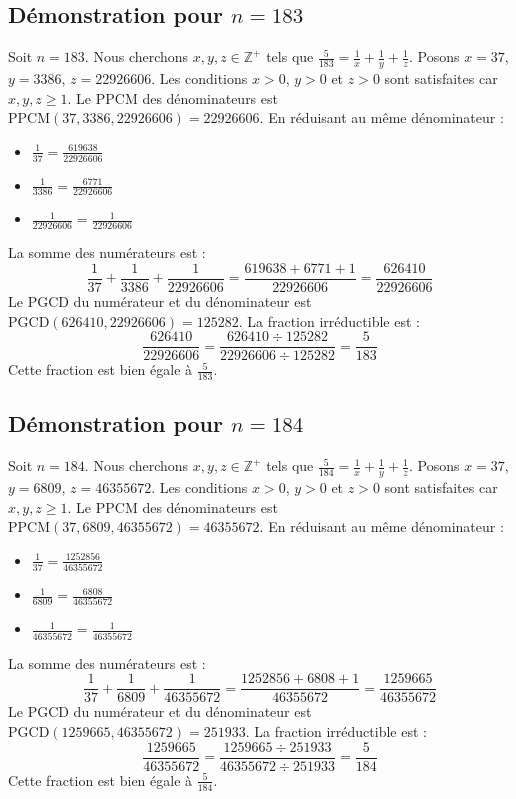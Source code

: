 \documentclass[11pt,a4paper]{article}
\begin{document}
\subsection{Démonstration pour $n = 183$}
Soit $n = 183$. Nous cherchons $x, y, z \in \mathbb{Z}^{+}$ tels que $\frac{5}{183} = \frac{1}{x} + \frac{1}{y} + \frac{1}{z}$.
Posons $x = 37$, $y = 3386$, $z = 22926606$.
Les conditions $x > 0$, $y > 0$ et $z > 0$ sont satisfaites car $x, y, z \geq 1$.
Le PPCM des dénominateurs est $\text{PPCM}(37, 3386, 22926606) = 22926606$.
En réduisant au même dénominateur :
\begin{itemize}
    \item $\frac{1}{37} = \frac{619638}{22926606}$
    \item $\frac{1}{3386} = \frac{6771}{22926606}$
    \item $\frac{1}{22926606} = \frac{1}{22926606}$
\end{itemize}
La somme des numérateurs est :
$$ \frac{1}{37} + \frac{1}{3386} + \frac{1}{22926606} = \frac{619638 + 6771 + 1}{22926606} = \frac{626410}{22926606} $$
Le PGCD du numérateur et du dénominateur est $\text{PGCD}(626410, 22926606) = 125282$.
La fraction irréductible est :
$$ \frac{626410}{22926606} = \frac{626410 \div 125282}{22926606 \div 125282} = \frac{5}{183} $$
Cette fraction est bien égale à $\frac{5}{183}$.

\subsection{Démonstration pour $n = 184$}
Soit $n = 184$. Nous cherchons $x, y, z \in \mathbb{Z}^{+}$ tels que $\frac{5}{184} = \frac{1}{x} + \frac{1}{y} + \frac{1}{z}$.
Posons $x = 37$, $y = 6809$, $z = 46355672$.
Les conditions $x > 0$, $y > 0$ et $z > 0$ sont satisfaites car $x, y, z \geq 1$.
Le PPCM des dénominateurs est $\text{PPCM}(37, 6809, 46355672) = 46355672$.
En réduisant au même dénominateur :
\begin{itemize}
    \item $\frac{1}{37} = \frac{1252856}{46355672}$
    \item $\frac{1}{6809} = \frac{6808}{46355672}$
    \item $\frac{1}{46355672} = \frac{1}{46355672}$
\end{itemize}
La somme des numérateurs est :
$$ \frac{1}{37} + \frac{1}{6809} + \frac{1}{46355672} = \frac{1252856 + 6808 + 1}{46355672} = \frac{1259665}{46355672} $$
Le PGCD du numérateur et du dénominateur est $\text{PGCD}(1259665, 46355672) = 251933$.
La fraction irréductible est :
$$ \frac{1259665}{46355672} = \frac{1259665 \div 251933}{46355672 \div 251933} = \frac{5}{184} $$
Cette fraction est bien égale à $\frac{5}{184}$.
\end{document}
